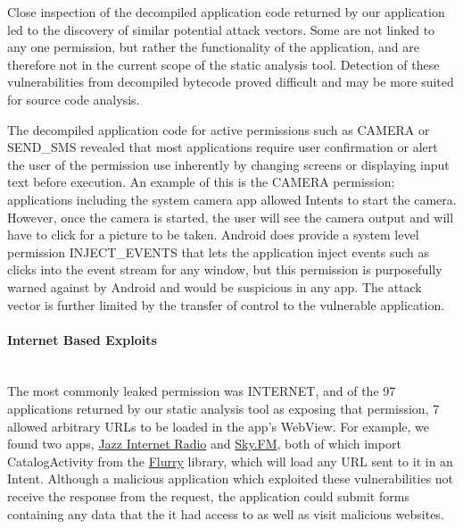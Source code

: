 \documentclass[12pt,a4paper]{article}
\begin{document}
Close inspection of the decompiled application code returned by our application
led to the discovery of similar potential attack vectors. Some are not linked
to any one permission, but rather the functionality of the application, and are
therefore not in the current scope of the static analysis tool. Detection of
these vulnerabilities from decompiled bytecode proved difficult and may be more
suited for source code analysis.

The decompiled application code for active permissions such as CAMERA or\\
SEND\_SMS revealed that most applications require user confirmation or alert the
user of the permission use inherently by changing screens or displaying input
text before execution. An example of this is the CAMERA permission; applications
including the system camera app allowed Intents to start the camera. However,
once the camera is started, the user will see the camera output and will have to
click for a picture to be taken. Android does provide a system level permission
INJECT\_EVENTS that lets the application inject events such as clicks into the
event stream for any window, but this permission is purposefully warned against
by Android and would be suspicious in any app. The attack vector is further
limited by the transfer of control to the vulnerable application.

\paragraph{Internet Based Exploits} ~\\
The most commonly leaked permission was INTERNET, and of the 97 applications
returned by our static analysis tool as exposing that permission, 7 allowed
arbitrary URLs to be loaded in the app's WebView. For example, we found two
apps,
\href{https://play.google.com/store/apps/details?id=com.audioaddict.jr\&feature=search\_result#?t=W251bGwsMSwxLDEsImNvbS5hdWRpb2FkZGljdC5qciJd}{Jazz
  Internet Radio} and
\href{https://play.google.com/store/apps/details?id=com.audioaddict.sky\&feature=search\_result#?t=W251bGwsMSwxLDEsImNvbS5hdWRpb2FkZGljdC5za3kiXQ..}{Sky.FM},
both of which import CatalogActivity from the
\href{http://support.flurry.com/index.php?title=AppCircle/GettingStarted/Android/TechnicalQuickStart}{Flurry}
library, which will load any URL sent to it in an Intent. Although a malicious
application which exploited these vulnerabilities not receive the response from
the request, the application could submit forms containing any data that the it
had access to as well as visit malicious websites.
\end{document}
